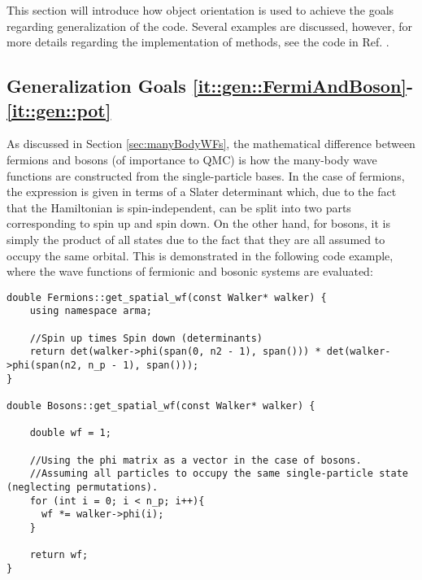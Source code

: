 This section will introduce how object orientation is used to achieve the goals regarding generalization of the code. Several examples are discussed, however, for more details regarding the implementation of methods, see the code in Ref. \cite{libBorealisCode}.

\subsection{Generalization Goals \ref{it::gen::FermiAndBoson}-\ref{it::gen::pot}}

As discussed in Section \ref{sec:manyBodyWFs}, the mathematical difference between fermions and bosons (of importance to QMC) is how the many-body wave functions are constructed from the single-particle bases. In the case of fermions, the expression is given in terms of a Slater determinant which, due to the fact that the Hamiltonian is spin-independent, can be split into two parts corresponding to spin up and spin down. On the other hand, for bosons, it is simply the product of all states due to the fact that they are all assumed to occupy the same orbital. This is demonstrated in the following code example, where the wave functions of fermionic and bosonic systems are evaluated:

\vspace{0.2cm}
\begin{lstlisting}[caption=The implementation of the evaluation of fermionic and bosonic wave functions. Line 5: The fermion class accesses the walker's single-particle state matrix and returns the determinant of the first half (spin up) times the determinant of the second half (spin down). Line 14-16: The boson class simply calculates the product of all the single-particle states.]
double Fermions::get_spatial_wf(const Walker* walker) {
    using namespace arma;
    
    //Spin up times Spin down (determinants)
    return det(walker->phi(span(0, n2 - 1), span())) * det(walker->phi(span(n2, n_p - 1), span()));
}

double Bosons::get_spatial_wf(const Walker* walker) {
 
    double wf = 1;
 
    //Using the phi matrix as a vector in the case of bosons.
    //Assuming all particles to occupy the same single-particle state (neglecting permutations).
    for (int i = 0; i < n_p; i++){
      wf *= walker->phi(i);
    }
    
    return wf;
}
\end{lstlisting}

